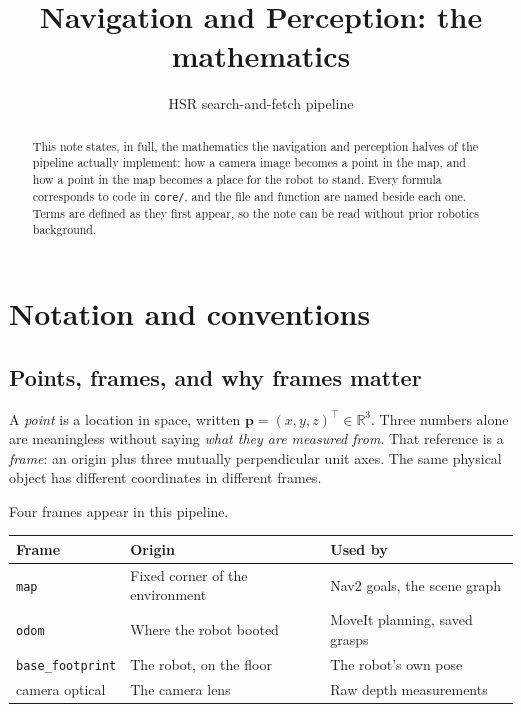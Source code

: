 \documentclass[11pt,a4paper]{article}
\title{Navigation and Perception: the mathematics}
\author{HSR search-and-fetch pipeline}
\date{}
\newcommand{\Reals}{\mathbb{R}}
\begin{document}
\maketitle

\begin{abstract}
This note states, in full, the mathematics the navigation and perception halves
of the pipeline actually implement: how a camera image becomes a point in the
map, and how a point in the map becomes a place for the robot to stand. Every
formula corresponds to code in \texttt{core/}, and the file and function are
named beside each one. Terms are defined as they first appear, so the note can
be read without prior robotics background.
\end{abstract}

\tableofcontents

\section{Notation and conventions}

\subsection{Points, frames, and why frames matter}

A \emph{point} is a location in space, written $\mathbf{p} = (x,y,z)^\top \in \Reals^3$.
Three numbers alone are meaningless without saying \emph{what they are measured
from}. That reference is a \emph{frame}: an origin plus three mutually
perpendicular unit axes. The same physical object has different coordinates in
different frames.

Four frames appear in this pipeline.

\begin{table}[h]
\centering
\begin{tabular}{lll}
\toprule
Frame & Origin & Used by \\
\midrule
\texttt{map}       & Fixed corner of the environment       & Nav2 goals, the scene graph \\
\texttt{odom}      & Where the robot booted                & MoveIt planning, saved grasps \\
\texttt{base\_footprint} & The robot, on the floor         & The robot's own pose \\
camera optical     & The camera lens                       & Raw depth measurements \\
\bottomrule
\end{tabular}
\end{table}
\end{document}
